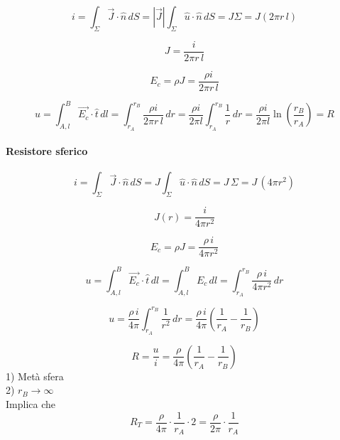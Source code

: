         \[
        i = \int_{\Sigma} \vec{J} \cdot \hat{n}\, dS 
           = |\vec{J}| \int_{\Sigma} \hat{u} \cdot \hat{n}\, dS
           = J \Sigma = J (2 \pi r\, l)
        \]
        
        \[
        J = \frac{{i}}{2 \pi r\, l}
        \]
        
        \[
        E_c = \rho J = \frac{\rho{i}}{2 \pi r\, l}
        \]
        
        \[
        u = \int_{A,l}^{B} \vec{E_c} \cdot \hat{t}\, dl 
             = \int_{r_A}^{r_B} \frac{\rho {i}}{2 \pi r\, l}\, dr
             = \frac{\rho i}{2 \pi l} \int_{r_A}^{r_B} \frac{1}{r}\, dr
             = \frac{\rho i}{2 \pi l} \ln{\left( \frac{r_B}{r_A} \right)} = R
        \]


\paragraph{Resistore sferico}

\[
i = \int_{\Sigma} \vec{J} \cdot \hat{n}\, dS 
  = J \int_{\Sigma} \hat{u} \cdot \hat{n}\, dS 
  = J \, \Sigma 
  = J \, (4 \pi r^2)
\]

\[
J(r) = \frac{i}{4 \pi r^2}
\]

\[
E_c = \rho J = \frac{\rho \, i}{4 \pi r^2}
\]

\[
u = \int_{A,l}^{B} \vec{E_c} \cdot \hat{t}\, dl 
    = \int_{A,l}^{B} E_c \, dl 
    = \int_{r_A}^{r_B} \frac{\rho \, i}{4 \pi r^2} \, dr
\]

\[
u = \frac{\rho \, i}{4 \pi} 
       \int_{r_A}^{r_B} \frac{1}{r^2} \, dr
     = \frac{\rho \, i}{4 \pi} 
       \left( \frac{1}{r_A} - \frac{1}{r_B} \right)
\]

\[
R = \frac{u}{i} 
  = \frac{\rho}{4 \pi} 
    \left( \frac{1}{r_A} - \frac{1}{r_B} \right)
\]
1) Metà sfera\\
2) $r_B\to \infty$\\
Implica che 
\[
    R_T = \frac{\rho}{4\pi}\cdot\frac{1}{r_A}\cdot2 = \frac{\rho}{2\pi}\cdot\frac{1}{r_A}
\]
        

            